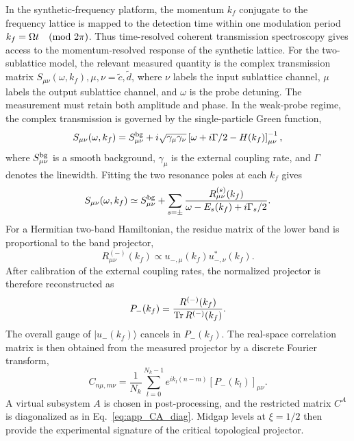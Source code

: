 \documentclass[aps,prl,twocolumn,preprintnumbers,amsmath,amssymb,superscriptaddress,10pt]{revtex4-2}
\begin{document}
In the synthetic-frequency platform, the momentum $k_f$ conjugate to the
frequency lattice is mapped to the detection time within one modulation
period $k_f=\Omega t \quad ({\rm mod}\ 2\pi)$. Thus time-resolved coherent transmission spectroscopy gives access to the momentum-resolved response of the synthetic lattice. For the two-sublattice model, the relevant measured quantity is the complex transmission matrix
$S_{\mu\nu}(\omega,k_f),
\mu,\nu=\tilde c,\tilde d$,
where $\nu$ labels the input sublattice channel, $\mu$ labels the output sublattice channel, and $\omega$ is the probe detuning. The measurement must retain both amplitude and phase.
In the weak-probe regime, the complex transmission is governed by the
single-particle Green function,
\begin{equation}
S_{\mu\nu}(\omega,k_f)
=
S^{\rm bg}_{\mu\nu}
+
i\sqrt{\gamma_\mu\gamma_\nu}
\left[
\omega+i\Gamma/2-H(k_f)
\right]^{-1}_{\mu\nu},
\label{eq:app_complex_transmission}
\end{equation}
where $S^{\rm bg}_{\mu\nu}$ is a smooth background, $\gamma_\mu$ is the
external coupling rate, and $\Gamma$ denotes the linewidth. Fitting the
two resonance poles at each $k_f$ gives
\begin{equation}
S_{\mu\nu}(\omega,k_f)
\simeq
S^{\rm bg}_{\mu\nu}
+
\sum_{s=\pm}
\frac{
R^{(s)}_{\mu\nu}(k_f)
}{
\omega-E_s(k_f)+i\Gamma_s/2
}.
\label{eq:app_pole_expansion}
\end{equation}
For a Hermitian two-band Hamiltonian, the residue matrix of the lower
band is proportional to the band projector,
\begin{equation}
R^{(-)}_{\mu\nu}(k_f)
\propto
u_{-,\mu}(k_f)u^{*}_{-,\nu}(k_f).
\label{eq:app_residue_projector}
\end{equation}
After calibration of the external coupling rates, the normalized projector
is therefore reconstructed as
\begin{equation}
P_-(k_f)
=
\frac{
R^{(-)}(k_f)
}{
{\rm Tr}\,R^{(-)}(k_f)
}.
\label{eq:app_projector_from_residue}
\end{equation}
The overall gauge of $|u_-(k_f)\rangle$ cancels in $P_-(k_f)$. The real-space correlation matrix is then obtained from the measured
projector by a discrete Fourier transform,
\begin{equation}
C_{n\mu,m\nu}
=
\frac{1}{N_k}
\sum_{l=0}^{N_k-1}
e^{ik_l(n-m)}
\left[P_-(k_l)\right]_{\mu\nu}.
\label{eq:app_exp_C_fourier}
\end{equation}
A virtual subsystem $A$ is chosen in post-processing, and the restricted
matrix $C^A$ is diagonalized as in Eq.~\eqref{eq:app_CA_diag}. Midgap
levels at $\xi=1/2$ then provide the experimental signature of the
critical topological projector.
\end{document}
